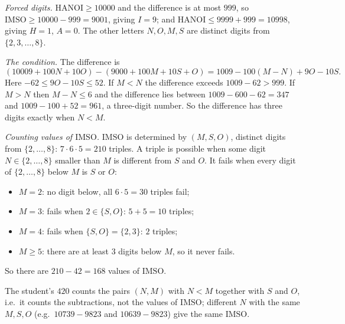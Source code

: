 \emph{Forced digits.} $\mathrm{HANOI}\ge10000$ and the difference is at most $999$, so $\mathrm{IMSO}\ge10000-999=9001$, giving $I=9$; and $\mathrm{HANOI}\le9999+999=10998$, giving $H=1$, $A=0$. The other letters $N,O,M,S$ are distinct digits from $\{2,3,\dots,8\}$.

\emph{The condition.} The difference is
\[
(10009+100N+10O)-(9000+100M+10S+O)=1009-100(M-N)+9O-10S .
\]
Here $-62\le9O-10S\le52$. If $M<N$ the difference exceeds $1009-62>999$. If $M>N$ then $M-N\le6$ and the difference lies between $1009-600-62=347$ and $1009-100+52=961$, a three-digit number. So the difference has three digits exactly when $N<M$.

\emph{Counting values of $\mathrm{IMSO}$.} $\mathrm{IMSO}$ is determined by $(M,S,O)$, distinct digits from $\{2,\dots,8\}$: $7\cdot6\cdot5=210$ triples. A triple is possible when some digit $N\in\{2,\dots,8\}$ smaller than $M$ is different from $S$ and $O$. It fails when every digit of $\{2,\dots,8\}$ below $M$ is $S$ or $O$:
\begin{itemize}
\item $M=2$: no digit below, all $6\cdot5=30$ triples fail;
\item $M=3$: fails when $2\in\{S,O\}$: $5+5=10$ triples;
\item $M=4$: fails when $\{S,O\}=\{2,3\}$: $2$ triples;
\item $M\ge5$: there are at least $3$ digits below $M$, so it never fails.
\end{itemize}
So there are $210-42=\boxed{168}$ values of $\mathrm{IMSO}$.

The student's $420$ counts the pairs $(N,M)$ with $N<M$ together with $S$ and $O$, i.e.\ it counts the subtractions, not the values of $\mathrm{IMSO}$; different $N$ with the same $M,S,O$ (e.g.\ $10739-9823$ and $10639-9823$) give the same $\mathrm{IMSO}$.
